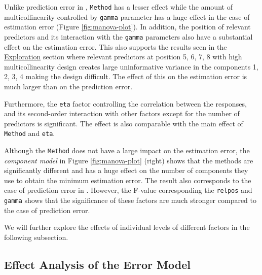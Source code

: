 \documentclass[12pt,3p,authoryear]{elsarticle}
\providecommand{\tightlist}{%
  \setlength{\itemsep}{0pt}\setlength{\parskip}{0pt}}
\begin{document}
\begin{description}
\tightlist
\item[\textbf{Error Model:}]
Unlike prediction error in \citet{rimal2019pred}, \texttt{Method} has a lesser effect while the amount of multicollinearity controlled by \texttt{gamma} parameter has a huge effect in the case of estimation error (Figure \ref{fig:manova-plot}). In addition, the position of relevant predictors and its interaction with the \texttt{gamma} parameters also have a substantial effect on the estimation error. This also supports the results seen in the \protect\hyperlink{exploration}{Exploration} section where relevant predictors at position 5, 6, 7, 8 with high multicollinearity design creates large uninformative variance in the components 1, 2, 3, 4 making the design difficult. The effect of this on the estimation error is much larger than on the prediction error.

Furthermore, the \texttt{eta} factor controlling the correlation between the responses, and its second-order interaction with other factors except for the number of predictors is significant. The effect is also comparable with the main effect of \texttt{Method} and \texttt{eta}.
\item[\textbf{Component Model:}]
Although the \texttt{Method} does not have a large impact on the estimation error, the \emph{component model} in Figure \ref{fig:manova-plot} (right) shows that the methods are significantly different and has a huge effect on the number of components they use to obtain the minimum estimation error. The result also corresponds to the case of prediction error in \citet{rimal2019pred}. However, the F-value corresponding the \texttt{relpos} and \texttt{gamma} shows that the significance of these factors are much stronger compared to the case of prediction error.
\end{description}

We will further explore the effects of individual levels of different factors in the following subsection.

\hypertarget{effect-analysis-of-the-error-model}{%
\subsection{Effect Analysis of the Error Model}\label{effect-analysis-of-the-error-model}}
\end{document}
